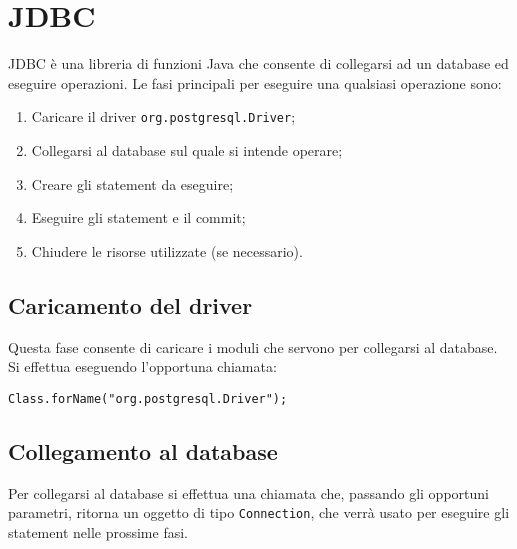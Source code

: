 \documentclass[a4paper, 10pt, titlepage]{article}
\begin{document}
\section{JDBC}
JDBC è una libreria di funzioni Java che consente di collegarsi ad un database ed eseguire operazioni.
Le fasi principali per eseguire una qualsiasi operazione sono:

\begin{enumerate}
	\item Caricare il driver \lstinline|org.postgresql.Driver|;	
	\item Collegarsi al database sul quale si intende operare;	
	\item Creare gli statement da eseguire;	
	\item Eseguire gli statement e il commit;	
	\item Chiudere le risorse utilizzate (se necessario).
\end{enumerate}

\subsection{Caricamento del driver}
Questa fase consente di caricare i moduli che servono per collegarsi al database. Si effettua eseguendo l'opportuna chiamata:
\lstset{language=Java}
\begin{lstlisting}
Class.forName("org.postgresql.Driver");
\end{lstlisting}

\subsection{Collegamento al database}
Per collegarsi al database si effettua una chiamata che, passando gli opportuni parametri, ritorna un oggetto di tipo \lstinline|Connection|, che verrà usato per eseguire gli statement nelle prossime fasi.
\end{document}
